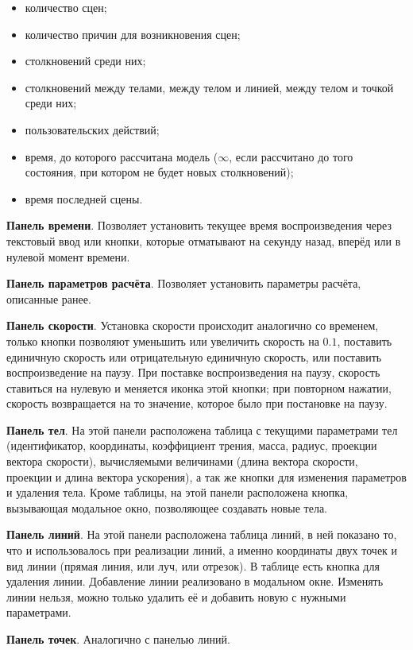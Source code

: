 \begin{itemize}
    \item количество сцен;
    \item количество причин для возникновения сцен;
    \item столкновений среди них;
    \item столкновений между телами, между телом и линией, между телом и точкой среди них;
    \item пользовательских действий;
    \item время, до которого рассчитана модель (\(\infty\), если рассчитано до того состояния, при котором не будет новых столкновений);
    \item время последней сцены.
\end{itemize}

\textbf{Панель времени}. Позволяет установить текущее время воспроизведения через текстовый ввод или кнопки,
которые отматывают на секунду назад, вперёд или в нулевой момент времени.

\textbf{Панель параметров расчёта}.
Позволяет установить параметры расчёта, описанные ранее.

\textbf{Панель скорости}. Установка скорости происходит аналогично со временем, только кнопки
позволяют уменьшить или увеличить скорость на \(0.1\), поставить единичную скорость или
отрицательную единичную скорость, или поставить воспроизведение на паузу.
При поставке воспроизведения на паузу, скорость ставиться на нулевую и меняется иконка этой кнопки;
при повторном нажатии, скорость возвращается на то значение, которое было при постановке на паузу.

\textbf{Панель тел}.
На этой панели расположена таблица с текущими параметрами тел
(идентификатор, координаты, коэффициент трения, масса, радиус, проекции вектора скорости),
вычисляемыми величинами (длина вектора скорости, проекции и длина вектора ускорения),
а так же кнопки для изменения параметров и удаления тела.
Кроме таблицы, на этой панели расположена кнопка, вызывающая модальное окно,
позволяющее создавать новые тела.

\textbf{Панель линий}. На этой панели расположена таблица линий, в ней
показано то, что и использовалось при реализации линий,
а именно координаты двух точек и вид линии (прямая линия, или луч, или отрезок).
В таблице есть кнопка для удаления линии. Добавление линии реализовано в модальном окне.
Изменять линии нельзя, можно только удалить её и добавить новую с нужными параметрами.

\textbf{Панель точек}. Аналогично с панелью линий.

